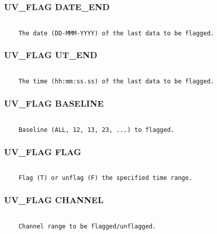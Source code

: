 \subsubsection{UV\_FLAG DATE\_END}
\begin{verbatim}

    The date (DD-MMM-YYYY) of the last data to be flagged.

\end{verbatim}
\subsubsection{UV\_FLAG UT\_END}
\begin{verbatim}

    The time (hh:mm:ss.ss) of the last data to be flagged.

\end{verbatim}
\subsubsection{UV\_FLAG BASELINE}
\begin{verbatim}

    Baseline (ALL, 12, 13, 23, ...) to flagged.

\end{verbatim}
\subsubsection{UV\_FLAG FLAG}
\begin{verbatim}

    Flag (T) or unflag (F) the specified time range.

\end{verbatim}
\subsubsection{UV\_FLAG CHANNEL}
\begin{verbatim}

    Channel range to be flagged/unflagged.

\end{verbatim}
